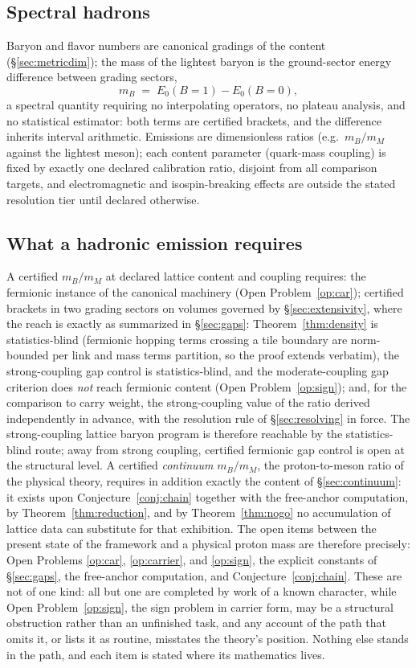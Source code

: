 \documentclass[11pt]{article}
\theoremstyle{definition}
\theoremstyle{remark}
\begin{document}
\subsection{Spectral hadrons}
Baryon and flavor numbers are canonical gradings of the content
(\S\ref{sec:metricdim}); the mass of the lightest baryon is the
ground-sector energy difference between grading sectors,
\[
m_B \;=\; E_0(B{=}1) - E_0(B{=}0),
\]
a spectral quantity requiring no interpolating operators, no plateau
analysis, and no statistical estimator: both terms are certified
brackets, and the difference inherits interval arithmetic.  Emissions
are dimensionless ratios (e.g.\ $m_B/m_M$ against the lightest meson);
each content parameter (quark-mass coupling) is fixed by exactly one
declared calibration ratio, disjoint from all comparison targets, and
electromagnetic and isospin-breaking effects are outside the stated
resolution tier until declared otherwise.

\subsection{What a hadronic emission requires}
A certified $m_B/m_M$ at declared lattice content and coupling requires:
the fermionic instance of the canonical machinery (Open
Problem~\ref{op:car}); certified brackets in two grading sectors on
volumes governed by \S\ref{sec:extensivity}, where the reach is exactly
as summarized in \S\ref{sec:gaps}: Theorem~\ref{thm:density} is
statistics-blind (fermionic hopping terms crossing a tile boundary are
norm-bounded per link and mass terms partition, so the proof extends
verbatim), the strong-coupling gap control is statistics-blind, and the
moderate-coupling gap criterion does \emph{not} reach fermionic content
(Open Problem~\ref{op:sign}); and, for the comparison to carry weight,
the strong-coupling value of the ratio derived independently in advance,
with the resolution rule of \S\ref{sec:resolving} in force.  The
strong-coupling lattice baryon program is therefore reachable by the
statistics-blind route; away from strong coupling, certified fermionic
gap control is open at the structural level.  A certified
\emph{continuum} $m_B/m_M$, the proton-to-meson ratio of the physical
theory, requires in addition exactly the content of
\S\ref{sec:continuum}: it exists upon Conjecture~\ref{conj:chain}
together with the free-anchor computation, by
Theorem~\ref{thm:reduction}, and by Theorem~\ref{thm:nogo} no
accumulation of lattice data can substitute for that exhibition.  The
open items between the present state of the framework and a physical
proton mass are therefore precisely: Open Problems \ref{op:car},
\ref{op:carrier}, and \ref{op:sign}, the explicit constants of
\S\ref{sec:gaps}, the free-anchor computation, and
Conjecture~\ref{conj:chain}.  These are not of one kind: all but one are
completed by work of a known character, while Open
Problem~\ref{op:sign}, the sign problem in carrier form, may be a
structural obstruction rather than an unfinished task, and any account
of the path that omits it, or lists it as routine, misstates the
theory's position.  Nothing else stands in the path, and each item is
stated where its mathematics lives.
\end{document}
